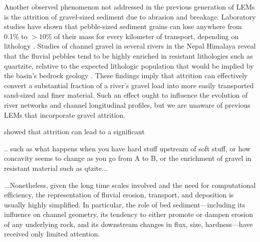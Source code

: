 \documentclass[journal abbreviation, manuscript]{copernicus}
\begin{document}
Another observed phenomenon not addressed in the previous generation of LEMs is the attrition of gravel-sized sediment due to abrasion and breakage. Laboratory studies have shown that pebble-sized sediment grains can lose anywhere from 0.1\% to $>10$\% of their mass for every kilometer of transport, depending on lithology \citep{attal2009pebble}. Studies of channel gravel in several rivers in the Nepal Himalaya reveal that the fluvial pebbles tend to be highly enriched in resistant lithologies such as quartzite, relative to the expected lithologic population that would be implied by the basin's bedrock geology \citep{attal2006changes,dingle2017}. These findings imply that attrition can effectively convert a substantial fraction of a river's gravel load into more easily transported sand-sized and finer material. Such an effect ought to influence the evolution of river networks and channel longitudinal profiles, but we are unaware of previous LEMs that incorporate gravel attrition.



\citet{attal2006changes} showed that attrition can lead to a significant 





.. such as what happens when you have hard stuff upstream of soft stuff, or how concavity seems to change as you go from A to B, or the enrichment of gravel in resistant material such as qtzite...

...Nonetheless, given the long time scales involved and the need for computational efficiency, the representation of fluvial erosion, transport, and deposition is usually highly simplified. In particular, the role of bed sediment---including its influence on channel geometry, its tendency to either promote or dampen erosion of any underlying rock, and its downstream changes in flux, size, hardness---have received only limited attention.
\end{document}
